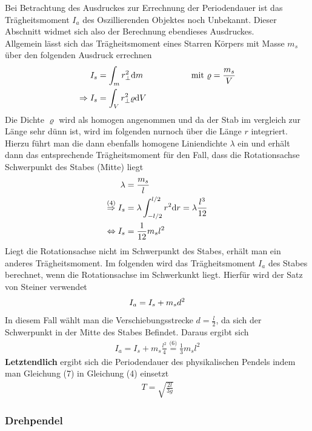 \documentclass[11pt,a4paper]{article}
\begin{document}
Bei Betrachtung des Ausdruckes zur Errechnung der Periodendauer ist das Trägheitsmoment $I_a$ des Oszillierenden Objektes noch Unbekannt. Dieser Abschnitt widmet sich also der Berechnung ebendieses Ausdruckes.\\

Allgemein lässt sich das Trägheitsmoment eines Starren Körpers mit Masse $m_s$ über den folgenden Ausdruck errechnen
\begin{align}
	I_s &= \int_{m}^{}  r^2_\perp \mathrm{d}m  \hspace{2cm}\text{mit  }  \varrho = \frac{m_s}{V} \notag\\
	\Rightarrow I_s &= \int_{V}^{} r^2_\perp \varrho \mathrm{d}V
\end{align}
Die Dichte $\varrho$ wird als homogen angenommen und da der Stab im vergleich zur Länge sehr dünn ist, wird im folgenden nurnoch über die Länge $r$ integriert. Hierzu führt man die dann ebenfalls homogene Liniendichte $\lambda$ ein und erhält dann das entsprechende Trägheitsmoment für den Fall, dass die Rotationsachse Schwerpunkt des Stabes (Mitte) liegt
\begin{align}
	\lambda &= \frac{m_s}{l} \notag \\
	\overset{\text{(4)}}{\underset{\text{ }}{\Rightarrow}} I_s &= \lambda\int_{-l/2}^{l/2} r^2 \mathrm{d}r = \lambda \frac{l^3}{12}\notag \\
	\Leftrightarrow I_s &= \frac{1}{12} m_s l^2
\end{align}
Liegt die Rotationsachse nicht im Schwerpunkt des Stabes, erhält man ein anderes Trägheitsmoment. Im folgenden wird das Trägheitsmoment $I_a$ des Stabes berechnet, wenn die Rotationsachse im Schwerkunkt liegt. Hierfür wird der Satz von Steiner verwendet
\begin{align}
	I_a = I_s + m_s d^2 \notag
\end{align}
	In diesem Fall wählt man die Verschiebungsstrecke $d=\frac{l}{2}$, da sich der Schwerpunkt in der Mitte des Stabes Befindet. Daraus ergibt sich
\begin{align}
	 I_a = I_s +m_s \frac{l^2}{4}  \overset{\text{(6)}}{=} \frac{1}{3} m_s l^2
\end{align}
{\bf Letztendlich} ergibt sich die Periodendauer des physikalischen Pendels indem man Gleichung (7) in Gleichung (4) einsetzt
\begin{align}
	T = \sqrt{\frac{2l}{3g}}
\end{align}
       \subsubsection{Drehpendel}
\end{document}
